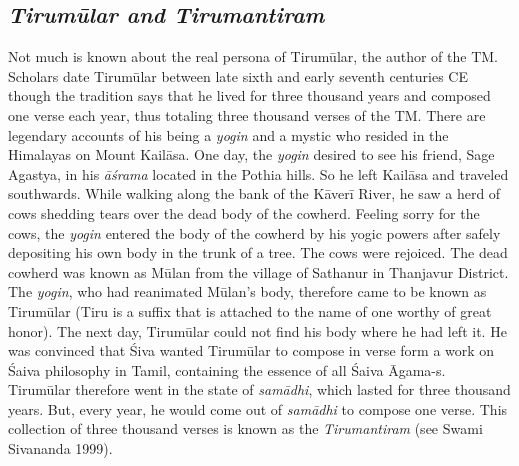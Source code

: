 \subsection*{\textit{Tirumūlar and Tirumantiram}}

\vskip -6pt

Not much is known about the real persona of Tirumūlar, the author of the TM. Scholars date Tirumūlar between late sixth and early seventh centuries CE though the tradition says that he lived for three thousand years and composed one verse each year, thus totaling three thousand verses of the TM. There are legendary accounts of his being a \textit{yogin} and a mystic who resided in the Himalayas on Mount Kailāsa. One day, the \textit{yogin} desired to see his friend, Sage Agastya, in his \textit{āśrama} located in the Pothia hills. So he left Kailāsa and traveled southwards. While walking along the bank of the Kāverī River, he saw a herd of cows shedding tears over the dead body of the cowherd. Feeling sorry for the cows, the \textit{yogin} entered the body of the cowherd by his yogic powers after safely depositing his own body in the trunk of a tree. The cows were rejoiced. The dead cowherd was known as Mūlan from the village of Sathanur in Thanjavur District. The \textit{yogin}, who had reanimated Mūlan’s body, therefore came to be known as Tirumūlar (Tiru is a suffix that is attached to the name of one worthy of great honor). The next day, Tirumūlar could not find his body where he had left it. He was convinced that Śiva wanted Tirumūlar to compose in verse form a work on Śaiva philosophy in Tamil, containing the essence of all Śaiva Āgama-s. Tirumūlar therefore went in the state of \textit{samādhi}, which lasted for three thousand years. But, every year, he would come out of \textit{samādhi} to compose one verse. This collection of three thousand verses is known as the \textit{Tirumantiram} (see Swami Sivananda 1999).

